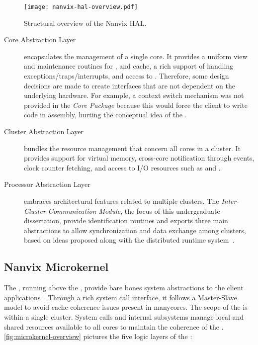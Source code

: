 		\begin{figure}[!tb]
			\centering%
			\caption{Structural overview of the Nanvix HAL.}%
			\label{fig:hal-overview}%
			\texttt{[image: nanvix-hal-overview.pdf]}%
		\end{figure}

		\begin{description}

			\item[Core Abstraction Layer]
				encapsulates the management of a single core.
				It provides a uniform view and maintenance routines for \tlbs, \mmu and cache,
				a rich support of handling exceptions/traps/interrupts, and
				access to \pmio.
				Therefore, some design decisions are made to create interfaces that are not
				dependent on the underlying hardware.
				For example, a context switch mechanism was not provided in the
				\textit{Core Package} because this would force the client \os
				to write code in assembly, hurting the conceptual idea of the \hal.

			\item[Cluster Abstraction Layer]
				bundles the resource management that concern all cores in a cluster.
				It provides support for virtual memory, cross-core notification through events,
				clock counter fetching, and access to I/O resources such as \mmio and \dma.

			\item[Processor Abstraction Layer]
				embraces architectural features related to multiple clusters.
				The \textit{Inter-Cluster Communication Module}, the focus of
				this undergraduate dissertation, provide \noc identification routines and
				exports three main abstractions to allow synchronization and data
				exchange among clusters, based on ideas proposed along with the
				\nodeos distributed runtime system~\cite{DeDinechin2013-1}.

		\end{description}

	\subsection{Nanvix Microkernel}
	\label{sec.microkernel}

		The \nanvix \microkernel, running above the \hal, provide
		bare bones system abstractions to the client applications~\cite{penna:sbesc19}.
		Through a rich system call interface, it follows a Master-Slave \os model
		to avoid cache coherence issues present in manycores.
		The scope of the \microkernel is within a single cluster.
		System calls and internal subsystems manage local and shared resources
		available to all cores to maintain the coherence of the \os.
		\autoref{fig:microkernel-overview} pictures the five logic layers of the \microkernel:

